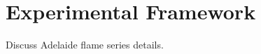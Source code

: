 \section{Experimental Framework}
\label{sec:lesresults:exp}

Discuss Adelaide flame series details.
